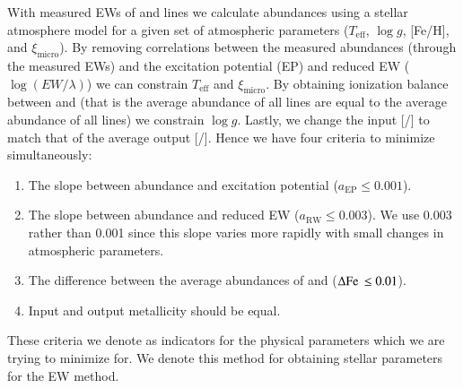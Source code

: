 \documentclass{aa}
\begin{document}
With measured EWs of  and  lines we calculate abundances
using a stellar atmosphere model for a given set of atmospheric parameters
($T_\mathrm{eff}$, $\log g$, [Fe/H], and $\xi_\mathrm{micro}$). By removing
correlations between the measured abundances (through the measured EWs) and the
excitation potential (EP) and reduced EW ($\log(EW/\lambda)$) we can constrain
$T_\mathrm{eff}$ and $\xi_\mathrm{micro}$. By obtaining ionization balance
between  and  (that is the average abundance of all
 lines are equal to the average abundance of all  lines)
we constrain $\log g$. Lastly, we change the input [/] to match
that of the average output [/]. Hence we have four criteria to
minimize simultaneously:

\begin{enumerate}
    \item The slope between abundance and excitation potential ($a_\mathrm{EP}\le0.001$).
    \item The slope between abundance and reduced EW ($a_\mathrm{RW}\le0.003$).
          We use 0.003 rather than 0.001 since this slope varies more rapidly
          with small changes in atmospheric parameters.
    \item The difference between the average abundances of  and
           ($\Delta\ion{Fe}{}\le0.01$).
    \item Input and output metallicity should be equal.
\end{enumerate}
These criteria we denote as indicators for the physical parameters which we are
trying to minimize for. We denote this method for obtaining stellar parameters
for the EW method.
\end{document}
